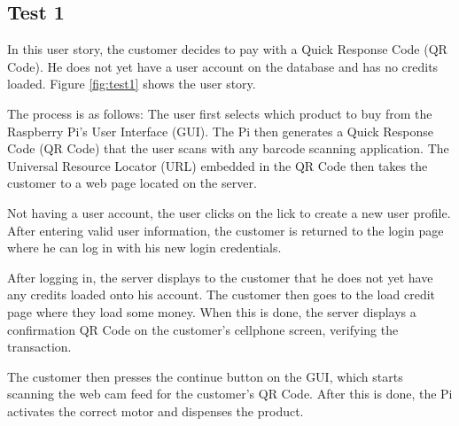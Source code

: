 \subsection{Test 1}

In this user story, the customer decides to pay with a Quick Response Code (QR Code).
He does not yet have a user account on the database and has no credits loaded.
Figure \ref{fig:test1} shows the user story. 

The process is as follows: The user first selects which product to buy from the Raspberry
Pi's User Interface (GUI). The Pi then generates a Quick Response Code (QR Code) that the
user scans with any barcode scanning application. The Universal Resource Locator (URL)
embedded in the QR Code then takes the customer to a web page located on the server. 

Not having a user account, the user clicks on the lick to create a new user profile. After
entering valid user information, the customer is returned to the login  page where he
can log in with his new login credentials. 

After logging in, the server displays to the customer that he does not yet have any
credits loaded onto his account. The customer then goes to the load credit page where
they load some money. When this is done, the server displays a confirmation QR Code on
the customer's cellphone screen, verifying the transaction.

The customer then presses the continue button on the GUI, which starts scanning the web
cam feed for the customer's QR Code. After this is done, the Pi activates the correct
motor and dispenses the product.

